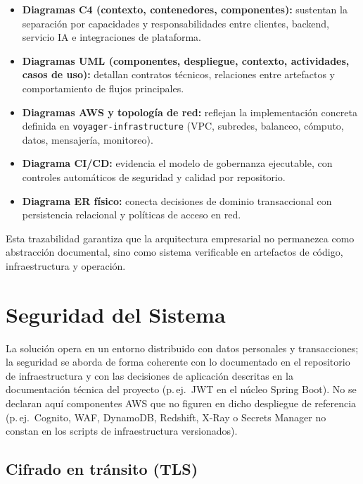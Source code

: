 \documentclass[12pt, letterpaper]{article}
\begin{document}
\begin{itemize}
\item \textbf{Diagramas C4 (contexto, contenedores, componentes):} sustentan la separación por capacidades y responsabilidades entre clientes, backend, servicio IA e integraciones de plataforma.
\item \textbf{Diagramas UML (componentes, despliegue, contexto, actividades, casos de uso):} detallan contratos técnicos, relaciones entre artefactos y comportamiento de flujos principales.
\item \textbf{Diagramas AWS y topología de red:} reflejan la implementación concreta definida en \texttt{voyager-infrastructure} (VPC, subredes, balanceo, cómputo, datos, mensajería, monitoreo).
\item \textbf{Diagrama CI/CD:} evidencia el modelo de gobernanza ejecutable, con controles automáticos de seguridad y calidad por repositorio.
\item \textbf{Diagrama ER físico:} conecta decisiones de dominio transaccional con persistencia relacional y políticas de acceso en red.
\end{itemize}

Esta trazabilidad garantiza que la arquitectura empresarial no permanezca como abstracción documental, sino como sistema verificable en artefactos de código, infraestructura y operación.

\section{Seguridad del Sistema}

La solución opera en un entorno distribuido con datos personales y transacciones; la seguridad se aborda de forma coherente con lo documentado en el repositorio de infraestructura y con las decisiones de aplicación descritas en la documentación técnica del proyecto (p.\,ej.\ JWT en el núcleo Spring Boot). No se declaran aquí componentes AWS que no figuren en dicho despliegue de referencia (p.\,ej.\ Cognito, WAF, DynamoDB, Redshift, X-Ray o Secrets Manager no constan en los scripts de infraestructura versionados).

\subsection{Cifrado en tránsito (TLS)}
\end{document}
